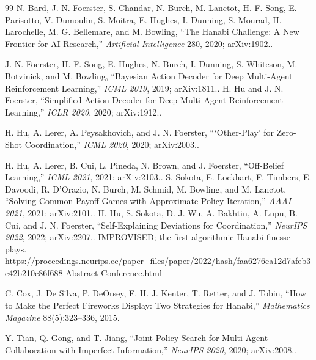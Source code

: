 \begin{thebibliography}{99}
N. Bard, J. N. Foerster, S. Chandar, N. Burch, M. Lanctot, H. F. Song,
E. Parisotto, V. Dumoulin, S. Moitra, E. Hughes, I. Dunning, S. Mourad,
H. Larochelle, M. G. Bellemare, and M. Bowling, ``The Hanabi Challenge: A New
Frontier for AI Research,'' \emph{Artificial Intelligence} 280, 2020;
arXiv:1902..

J. N. Foerster, H. F. Song, E. Hughes, N. Burch, I. Dunning, S. Whiteson,
M. Botvinick, and M. Bowling, ``Bayesian Action Decoder for Deep Multi-Agent
Reinforcement Learning,'' \emph{ICML 2019}, 2019; arXiv:1811..
H. Hu and J. N. Foerster, ``Simplified Action Decoder for Deep Multi-Agent
Reinforcement Learning,'' \emph{ICLR 2020}, 2020; arXiv:1912..

H. Hu, A. Lerer, A. Peysakhovich, and J. N. Foerster, ```Other-Play' for
Zero-Shot Coordination,'' \emph{ICML 2020}, 2020; arXiv:2003..

H. Hu, A. Lerer, B. Cui, L. Pineda, N. Brown, and J. Foerster, ``Off-Belief
Learning,'' \emph{ICML 2021}, 2021; arXiv:2103..
S. Sokota, E. Lockhart, F. Timbers, E. Davoodi, R. D'Orazio, N. Burch,
M. Schmid, M. Bowling, and M. Lanctot, ``Solving Common-Payoff Games with
Approximate Policy Iteration,'' \emph{AAAI 2021}, 2021; arXiv:2101..
H. Hu, S. Sokota, D. J. Wu, A. Bakhtin, A. Lupu, B. Cui, and J. N. Foerster,
``Self-Explaining Deviations for Coordination,'' \emph{NeurIPS 2022}, 2022;
arXiv:2207.. IMPROVISED; the first algorithmic Hanabi finesse plays.\\
\url{https://proceedings.neurips.cc/paper_files/paper/2022/hash/faa6276ea12d7afeb3e42b210c86f688-Abstract-Conference.html}

C. Cox, J. De Silva, P. DeOrsey, F. H. J. Kenter, T. Retter, and J. Tobin, ``How
to Make the Perfect Fireworks Display: Two Strategies for Hanabi,''
\emph{Mathematics Magazine} 88(5):323--336, 2015.

Y. Tian, Q. Gong, and T. Jiang, ``Joint Policy Search for Multi-Agent
Collaboration with Imperfect Information,'' \emph{NeurIPS 2020}, 2020;
arXiv:2008..


\end{thebibliography}
